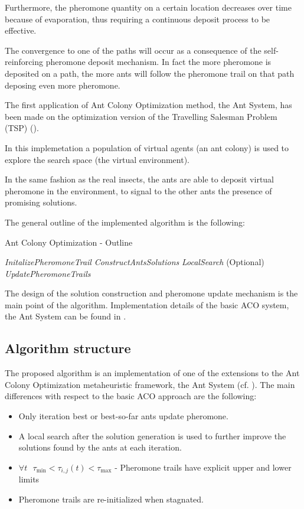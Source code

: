 \begin{homeworkProblem}
Furthermore, the pheromone quantity on a certain location decreases over time because of evaporation, thus requiring a continuous deposit process to be effective.

The convergence to one of the paths will occur as a consequence of the self-reinforcing pheromone deposit mechanism.
In fact the more pheromone is deposited on a path, the more ants will follow the pheromone trail on that path deposing even more pheromone.

The first application of Ant Colony Optimization method, the Ant System, has been made on the optimization version of the Travelling Salesman Problem (TSP) (\cite{dorigo1996ant}).

In this implemetation a population of virtual agents (an ant colony) is used to explore the search space (the virtual environment).

In the same fashion as the real insects, the ants are able to deposit virtual pheromone in the environment, to signal to the other ants the presence of promising solutions.

The general outline of the implemented algorithm is the following: 

\begin{algorithm}[!h]
  \caption{Ant Colony Optimization - Outline}\label{aco}
  \begin{algorithmic}[1]
    \State \emph{InitalizePheromoneTrail} 
        \State \emph{ConstructAntsSolutions}
        \State \emph{LocalSearch} (Optional)
        \State \emph{UpdatePheromoneTrails}
    \EndWhile
\end{algorithmic}
\end{algorithm}

The design of the solution construction and pheromone update mechanism is the main point of the algorithm.
Implementation details of the basic ACO system, the Ant System can be found in \cite{dorigo2006artificial}.

\subsection{Algorithm structure} \label{sec:algstrucACO}
The proposed algorithm is an implementation of one of the extensions to the Ant Colony Optimization metaheuristic framework, the \maxmin Ant System (cf. \cite{stutzle2000max}).
The main differences with respect to the basic ACO approach are the following:
\begin{itemize}
  \item Only iteration best or best-so-far ants update pheromone.
  \item A local search after the solution generation is used to further improve the solutions found by the ants at each iteration.
  \item $\forall t \text{ } \tau_{\min} < \tau_{i,j}(t) < \tau_{\max}  $ - Pheromone trails have explicit upper and lower limits
  \item Pheromone trails are re-initialized when stagnated.
\end{itemize}


\end{homeworkProblem}
